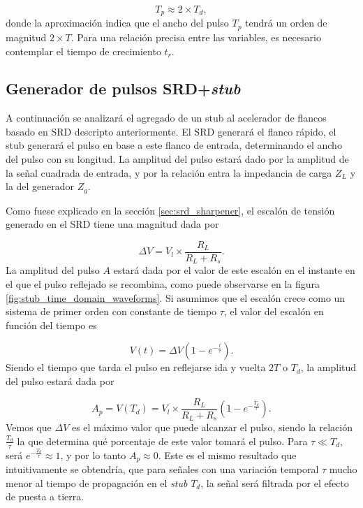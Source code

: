 \begin{equation}
    T_p \approx 2 \times T_d,
\end{equation}
donde la aproximación indica que el ancho del pulso $T_p$ tendrá un orden de
magnitud $2 \times T$. Para una relación precisa entre las variables, es
necesario contemplar el tiempo de crecimiento $t_r$.

\subsection{Generador de pulsos SRD+\textit{stub}}

A continuación se analizará el agregado de un stub al acelerador de flancos
basado en SRD descripto anteriormente. El SRD generará el flanco rápido, el stub
generará el pulso en base a este flanco de entrada, determinando el ancho del
pulso con su longitud. La amplitud del pulso estará dado por la amplitud de la
señal cuadrada de entrada, y por la relación entra la impedancia de carga $Z_L$
y la del generador $Z_g$.

Como fuese explicado en la sección \ref{sec:srd_sharpener}, el escalón de
tensión generado en el SRD tiene una magnitud dada por

\begin{equation}
    \Delta V = V_l \times \frac{R_L}{R_L+R_s}.
\end{equation}
La amplitud del pulso $A$ estará dada por el valor de este escalón en el instante en
el que el pulso reflejado se recombina, como puede observarse en la figura
\ref{fig:stub_time_domain_waveforms}. Si asumimos que el escalón
crece como un sistema de primer orden con constante de tiempo $\tau$, el valor
del escalón en función del tiempo es

\begin{equation}
  V(t) = \Delta V \left( 1-e^{-\frac{t}{\tau}}\right).
\end{equation}
Siendo el tiempo que tarda el pulso en reflejarse ida y vuelta $2T$ o $T_d$, la
amplitud del pulso estará dada por

\begin{equation}
    \label{eq:A_p}
    A_p = V(T_d) = V_l \times \frac{R_L}{R_L+R_s} \left(
    1-e^{-\frac{T_d}{\tau}}\right).
\end{equation}
Vemos que $\Delta V$ es el máximo valor que puede alcanzar el pulso, siendo la
relación $\frac{T_d}{\tau}$ la que determina qué porcentaje de este valor tomará
el pulso. Para $ \tau \ll T_d $, será $e^{-\frac{T_d}{\tau}} \approx 1$, y por lo
tanto $A_p \approx 0$. Este es el mismo resultado que intuitivamente se
obtendría, que para señales con una variación temporal $\tau$ mucho menor al
tiempo de propagación en el \textit{stub} $T_d$, la señal será filtrada por el
efecto de puesta a tierra.


